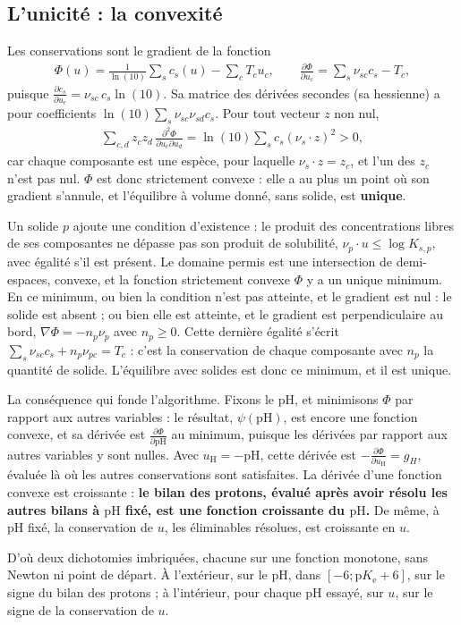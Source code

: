 \documentclass[a4paper,11pt]{article}
\newcommand\logo[1]{\hspace{-12pt}\makebox[12pt][l]{#1}}
\newcommand\rmqphys[1]{\begin{tcolorbox}[rmq, bleu]\logo{\faLightbulb}#1\end{tcolorbox}}
\newcommand\gras[1]{\textbf{#1}}
\newcommand\pH{\ensuremath{\mathrm{pH}}\xspace}
\newcommand\pKe{\ensuremath{\mathrm{p}K_\mathrm{e}}\xspace}
\newcommand\pdp[2]{\frac{\partial#1}{\partial#2}}
\newcommand\pare[1]{\left(#1\right)}
\begin{document}
\subsection{L'unicité : la convexité}
Les conservations sont le gradient de la fonction
\begin{align}
\Phi(u)=\frac1{\ln(10)}\sum_sc_s(u)-\sum_cT_cu_c,
\qquad
\pdp\Phi{u_c}=\sum_s\nu_{sc}c_s-T_c,
\end{align}
puisque $\pdp{c_s}{u_c}=\nu_{sc}\,c_s\ln(10)$.
Sa matrice des dérivées secondes (sa hessienne) a pour coefficients $\ln(10)\sum_s\nu_{sc}\nu_{sd}c_s$.
Pour tout vecteur $z$ non nul,
\begin{align}
\sum_{c,d}z_cz_d\,\frac{\partial^2\Phi}{\partial u_c\partial u_d}=\ln(10)\sum_sc_s\pare{\nu_s\cdot z}^2>0,
\end{align}
car chaque composante est une espèce, pour laquelle $\nu_s\cdot z=z_c$, et l'un des $z_c$ n'est pas nul.
$\Phi$ est donc strictement convexe : elle a au plus un point où son gradient s'annule, et l'équilibre à volume donné, sans solide, est \gras{unique}.

Un solide $p$ ajoute une condition d'existence : le produit des concentrations libres de ses composantes ne dépasse pas son produit de solubilité, $\nu_p\cdot u\le\log K_{s,p}$, avec égalité s'il est présent.
Le domaine permis est une intersection de demi-espaces, convexe, et la fonction strictement convexe $\Phi$ y a un unique minimum.
En ce minimum, ou bien la condition n'est pas atteinte, et le gradient est nul : le solide est absent ; ou bien elle est atteinte, et le gradient est perpendiculaire au bord, $\nabla\Phi=-n_p\nu_p$ avec $n_p\ge0$.
Cette dernière égalité s'écrit $\sum_s\nu_{sc}c_s+n_p\nu_{pc}=T_c$ : c'est la conservation de chaque composante avec $n_p$ la quantité de solide.
L'équilibre avec solides est donc ce minimum, et il est unique.

\rmqphys{La conséquence qui fonde l'algorithme.
Fixons le \pH, et minimisons $\Phi$ par rapport aux autres variables : le résultat, $\psi(\pH)$, est encore une fonction convexe, et sa dérivée est $\pdp\Phi\pH$ au minimum, puisque les dérivées par rapport aux autres variables y sont nulles.
Avec $u_\mathrm H=-\pH$, cette dérivée est $-\pdp\Phi{u_\mathrm H}=g_H$, évaluée là où les autres conservations sont satisfaites.
La dérivée d'une fonction convexe est croissante : \gras{le bilan des protons, évalué après avoir résolu les autres bilans à \pH fixé, est une fonction croissante du \pH.}
De même, à \pH fixé, la conservation de $u$, les éliminables résolues, est croissante en $u$.}
\begin{algo}
D'où deux dichotomies imbriquées, chacune sur une fonction monotone, sans Newton ni point de départ.
À l'extérieur, sur le \pH, dans $[-6;\pKe+6]$, sur le signe du bilan des protons ; à l'intérieur, pour chaque \pH essayé, sur $u$, sur le signe de la conservation de $u$.
\end{algo}
\end{document}
